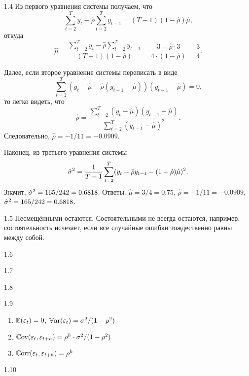 \begin{solution}{{1.4}}
Из первого уравнения системы получаем, что
\[
\sum_{t=2}^{T}y_{t} - \hat{\rho} \sum_{t=2}^{T}y_{t-1} = (T - 1) (1- \hat{\rho}) \hat{\mu} \text{,}
\]
откуда
\[
\hat{\mu} = \frac{\sum_{t=2}^{T}y_{t} - \hat{\rho} \sum_{t=2}^{T}y_{t-1}}{(T - 1) (1- \hat{\rho})} = \frac{3 - \hat{\rho} \cdot 3}{4\cdot(1-\hat{\rho})} = \frac{3}{4} \text{.}
\]

Далее, если второе уравнение системы переписать в виде
\[
\sum_{t=2}^{T}(y_t - \hat{\mu} - \hat{\rho} (y_{t-1} - \hat{\mu}))(y_{t-1} - \hat{\mu}) = 0 \text{,}
\]
то легко видеть, что
\[
\hat{\rho} = \frac{\sum_{t=2}^{T}(y_t - \hat{\mu})(y_{t-1} - \hat{\mu})}{\sum_{t=2}^{T}(y_{t-1} - \hat{\mu})^2} \text{.}
\]
Следовательно, $\hat{\rho} =-1/11= -0.0909$.

Наконец, из третьего уравнения системы
\[
\hat{\sigma}^2 =\frac{1}{T-1} \sum_{t=2}^{T}(y_t - \hat{\rho} y_{t-1} - (1 - \hat{\rho}) \hat{\mu})^2 \text{.}
\]
Значит, $\hat{\sigma}^2 = 165/242= 0.6818$. Ответы: $\hat{\mu} = 3/4= 0.75$, $\hat{\rho} = -1/11=-0.0909$, $\hat{\sigma}^2 =165/242=0.6818$.
\end{solution}
\protect \hypertarget {soln:1.5}{}
\begin{solution}{{1.5}}
Несмещёнными остаются. Состоятельными не всегда остаются, например, состоятельность исчезает, если все случайные ошибки тождественно равны между собой.

\end{solution}
\protect \hypertarget {soln:1.6}{}
\begin{solution}{{1.6}}
\end{solution}
\protect \hypertarget {soln:1.7}{}
\begin{solution}{{1.7}}
\end{solution}
\protect \hypertarget {soln:1.8}{}
\begin{solution}{{1.8}}
\end{solution}
\protect \hypertarget {soln:1.9}{}
\begin{solution}{{1.9}}
\begin{enumerate}
\item $\operatorname{\mathbb{E}}(\varepsilon_t)=0$, $\operatorname{\mathbb{V}\mathrm{ar}}(\varepsilon_t)=\sigma^2/(1-\rho^2)$
\item $\operatorname{\mathbb{C}\mathrm{ov}}(\varepsilon_t,\varepsilon_{t+h})=\rho^h\cdot \sigma^2/(1-\rho^2)$
\item $\operatorname{\mathbb{C}\mathrm{orr}}(\varepsilon_t,\varepsilon_{t+h})=\rho^h$
\end{enumerate}
\end{solution}
\protect \hypertarget {soln:1.10}{}
\begin{solution}{{1.10}}
\end{solution}
